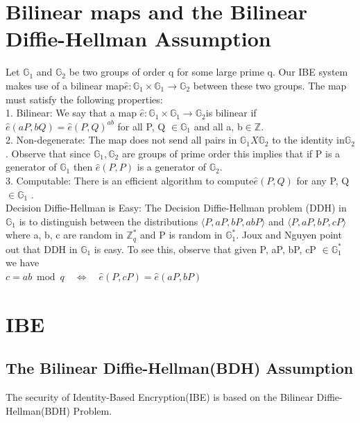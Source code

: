 \documentclass[runningheads,a4paper]{llncs}
\begin{document}
\section{Bilinear maps and the Bilinear Diffie-Hellman Assumption}
Let $ \mathbb{G}_{1}$ and $ \mathbb{G}_{2}$  be two groups of order q for some large prime q. Our IBE system makes use of a bilinear
map$\hat{e}: \mathbb{G}_{1} \times \mathbb{G}_{1} \rightarrow \mathbb{G}_{2}$ between these two groups. The map must satisfy the following properties:\\
1. Bilinear: We say that a map $\hat{e}: \mathbb{G}_{1} \times \mathbb{G}_{1} \rightarrow \mathbb{G}_{2}$is bilinear if $\hat{e}(a P, b Q)=\hat{e}(P, Q)^{a b}$ for all P, Q $\in \mathbb{G}_{1} $ and all a, b$\in \mathbb{Z} $.\\
2. Non-degenerate: The map does not send all pairs in $ \mathbb{G}_{1} X \mathbb{G}_{2}$  to the identity in$ \mathbb{G}_{2} $. Observe that since $ \mathbb{G}_{1},\mathbb{G}_{2} $ are groups of prime order this implies that if P is a generator of $\mathbb{G}_{1} $ then $\hat{e}(P, P)$ is a generator of $\mathbb{G}_{2} $.\\
3. Computable: There is an efficient algorithm to compute$\hat{e}(P, Q)$ for any P, Q $\in \mathbb{G}_{1} $ .\\
Decision Diffie-Hellman is Easy: The Decision Diffie-Hellman problem (DDH)  in $\mathbb{G}_{1} $ is to distinguish between the distributions $\langle P, a P, b P, a b P\rangle$ and $\langle P, a P, b P, c P\rangle$ where a, b, c are random
in $\mathbb{Z}_{q}^{*}$ and P is random in $\mathbb{G}_{1}^{*}$. Joux and Nguyen  point out that DDH in $\mathbb{G}_{1} $ is easy. To see
this, observe that given P, aP, bP, cP $\in \mathbb{G}_{1}^{*}$ we have\\$c=a b \bmod q \quad \Longleftrightarrow \quad \hat{e}(P, c P)=\hat{e}(a P, b P)$
\section{IBE}



\subsection{The Bilinear Diffie-Hellman(BDH) Assumption}

The security of Identity-Based Encryption(IBE) is based on the Bilinear Diffie-Hellman(BDH) Problem.
\end{document}
